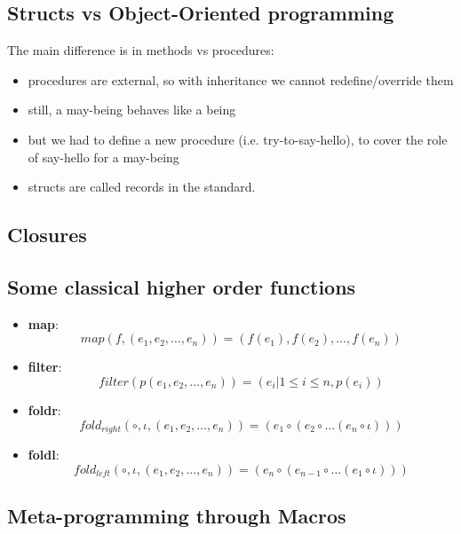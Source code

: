 \subsection{Structs vs Object-Oriented programming}
The main difference is in methods vs procedures:
\begin{itemize}
    \item procedures are external, so with inheritance we cannot redefine/override them
    \item still, a may-being behaves like a being
    \item but we had to define a new procedure (i.e. try-to-say-hello), to cover the role of say-hello for a may-being
    \item structs are called records in the standard.
\end{itemize}


\subsection{Closures}




\subsection{Some classical higher order functions}
\begin{itemize}
    \item \textbf{map}: \begin{equation} map(f,(e_1,e_2,\ldots,e_n)) = (f(e_1),f(e_2),\ldots,f(e_n)) \end{equation}
    \item \textbf{filter}: \begin{equation} filter(p(e_1,e_2,\ldots,e_n)) = (e_i|1\leq i\leq n,p(e_i)) \end{equation}
    \item \textbf{foldr}: \begin{equation} fold_{right}(\circ ,\iota,(e_1,e_2,\ldots,e_n)) = (e_1\circ(e_2\circ\ldots(e_n\circ\iota))) \end{equation}
    \item \textbf{foldl}: \begin{equation} fold_{left}(\circ ,\iota,(e_1,e_2,\ldots,e_n)) = (e_n\circ(e_{n-1}\circ\ldots(e_1\circ\iota))) \end{equation}
\end{itemize}


\subsection{Meta-programming through Macros}

